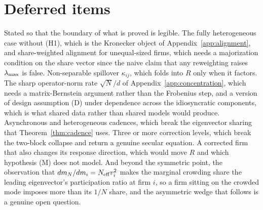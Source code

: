 \section{Deferred items}
\label{app:deferred}

Stated so that the boundary of what is proved is legible. The fully heterogeneous case without (H1), which is the Kronecker object of Appendix~\ref{app:alignment}, and share-weighted alignment for unequal-sized firms, which needs a majorization condition on the share vector since the naive claim that any reweighting raises $\lambda_{\max}$ is false. Non-separable spillover $\kappa_{ij}$, which folds into $R$ only when it factors. The sharp operator-norm rate $\sqrt{N}/d$ of Appendix~\ref{app:concentration}, which needs a matrix-Bernstein argument rather than the Frobenius step, and a version of design assumption (D) under dependence across the idiosyncratic components, which is what shared data rather than shared models would produce. Asynchronous and heterogeneous cadences, which break the eigenvector sharing that Theorem~\ref{thm:cadence} uses. Three or more correction levels, which break the two-block collapse and return a genuine secular equation. A corrected firm that also changes its response direction, which would move $R$ and which hypothesis (M) does not model. And beyond the symmetric point, the observation that $dm_N/dm_i = N_{\mathrm{eff}} v_i^2$ makes the marginal crowding share the leading eigenvector's participation ratio at firm $i$, so a firm sitting on the crowded mode imposes more than its $1/N$ share, and the asymmetric wedge that follows is a genuine open question.

